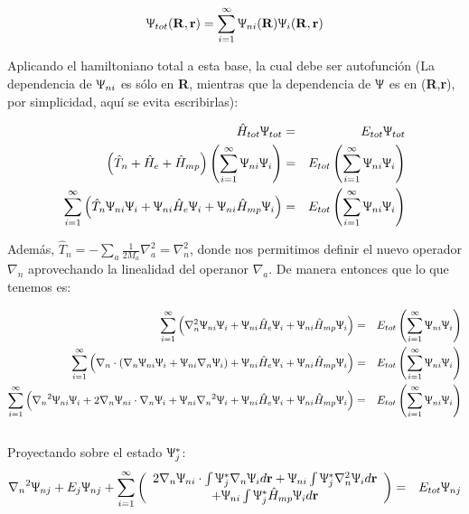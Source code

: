 \documentclass [11pt]{article}
\begin{document}
\begin{equation}
    {\bf \Uppsi}_{tot}({\bf R},{\bf r})=\sum_{i=1}^{\infty}\Uppsi_{ni}({\bf R})\Uppsi_i({\bf R},{\bf r})
\end{equation}

Aplicando el hamiltoniano total a esta base, la cual debe ser autofunción (La dependencia de $\Uppsi_{ni}$ es sólo en {\bf R}, mientras que la dependencia de $\Uppsi$ es en ({\bf R},{\bf r}), por simplicidad, aquí se evita escribirlas):

\begin{eqnarray}
    \hat H_{tot}\Uppsi_{tot} & = & E_{tot}\Uppsi_{tot}\\
    \left({\hat T}_n+{\hat H}_e+{\hat H}_{mp}\right)\left(\sum_{i=1}^{\infty}\Uppsi_{ni}\Uppsi_i\right) & = & E_{tot} \left(\sum_{i=1}^{\infty}\Uppsi_{ni}\Uppsi_i\right)\\
    \sum_{i=1}^{\infty}\left({\hat T}_n\Uppsi_{ni}\Uppsi_i+\Uppsi_{ni}{\hat H}_e\Uppsi_i+\Uppsi_{ni}{\hat H}_{mp}\Uppsi_i\right) & = & E_{tot} \left(\sum_{i=1}^{\infty}\Uppsi_{ni}\Uppsi_i\right)
\end{eqnarray}

Además, $\hat T_n=-\sum_{a}\frac{1}{2M_{a}}\nabla_a^2=\nabla_n^2$, donde nos permitimos definir el nuevo operador $\nabla_n$ aprovechando la linealidad del operanor $\nabla_a$. De manera entonces que lo que tenemos es:

\begin{eqnarray}
    \sum_{i=1}^{\infty}\left({\nabla_n^2}\Uppsi_{ni}\Uppsi_i+\Uppsi_{ni}{\hat H}_e\Uppsi_i+\Uppsi_{ni}{\hat H}_{mp}\Uppsi_i\right) & = & E_{tot} \left(\sum_{i=1}^{\infty}\Uppsi_{ni}\Uppsi_i\right)\\
    
    \sum_{i=1}^{\infty}\left({\nabla_n}\cdot({\nabla_n}\Uppsi_{ni}\Uppsi_i+\Uppsi_{ni}{\nabla_n}\Uppsi_i)+\Uppsi_{ni}{\hat H}_e\Uppsi_i+\Uppsi_{ni}{\hat H}_{mp}\Uppsi_i\right) & = & E_{tot} \left(\sum_{i=1}^{\infty}\Uppsi_{ni}\Uppsi_i\right)\\
    
    \sum_{i=1}^{\infty}\left({\nabla_n}^2\Uppsi_{ni}\Uppsi_i+2{\nabla_n}\Uppsi_{ni}\cdot {\nabla_n}\Uppsi_i+\Uppsi_{ni}{\nabla_n}^2\Uppsi_i+\Uppsi_{ni}{\hat H}_e\Uppsi_i+\Uppsi_{ni}{\hat H}_{mp}\Uppsi_i\right) & = & E_{tot} \left(\sum_{i=1}^{\infty}\Uppsi_{ni}\Uppsi_i\right)
\end{eqnarray}\\

Proyectando sobre el estado $\Uppsi_j^*$:
\begin{eqnarray*}
    {\nabla_n}^2\Uppsi_{nj}+E_j \Uppsi_{nj}+\sum_{i=1}^{\infty}\left(
    \begin{array}{cc}
         2{\nabla_n}\Uppsi_{ni}\cdot\int \Uppsi_j^*{\nabla_n}\Uppsi_i d{\bf r}+\Uppsi_{ni}\int \Uppsi_j^*{\nabla_n^2}\Uppsi_i d{\bf r}\\
         +\Uppsi_{ni}\int \Uppsi_j^*{\hat H}_{mp}\Uppsi_id{\bf r}
    \end{array}\right) & = & E_{tot}\Uppsi_{nj}
\end{eqnarray*}
\end{document}
